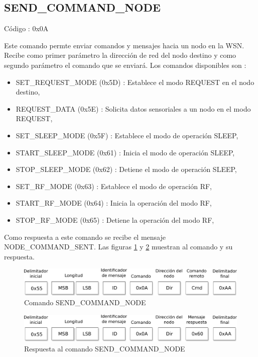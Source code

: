 \subsection{SEND\_COMMAND\_NODE}

Código : 0x0A

Este comando permte enviar comandos y mensajes hacia un nodo en la WSN. Recibe como primer parámetro la dirección de red del nodo destino y como segundo parámetro el comando que se enviará. Los comandos disponibles son : 

\begin{itemize}
	\item SET\_REQUEST\_MODE (0x5D) : Establece el modo REQUEST en el nodo destino, 
	\item REQUEST\_DATA (0x5E) : Solicita datos sensoriales a un nodo en el modo REQUEST,
	\item SET\_SLEEP\_MODE (0x5F) : Establece el modo de operación SLEEP, 
	\item START\_SLEEP\_MODE (0x61) : Inicia el modo de operación SLEEP, 
	\item STOP\_SLEEP\_MODE (0x62) : Detiene el modo de operación SLEEP, 
	\item SET\_RF\_MODE (0x63) : Establece el modo de operación RF, 
	\item START\_RF\_MODE (0x64) : Inicia la operación del modo RF, 
	\item STOP\_RF\_MODE (0x65) : Detiene la operación del modo RF, 
\end{itemize}

Como respuesta a este comando se recibe el mensaje NODE\_COMMAND\_SENT. Las figuras \ref{fig:cmd_set_mode} y \ref{fig:res_set_mode} muestran al comando y su respuesta. 

\begin{figure}
	\centering
	\includegraphics[scale=0.7]{capitulo_3_imgs/cmd_send_command.pdf}
	\caption{Comando SEND\_COMMAND\_NODE}
	\label{fig:cmd_set_mode}
\end{figure}

\begin{figure}
	\centering
	\includegraphics[scale=0.7]{capitulo_3_imgs/res_send_command.pdf}
	\caption{Respuesta al comando SEND\_COMMAND\_NODE}
	\label{fig:res_set_mode}
\end{figure}

